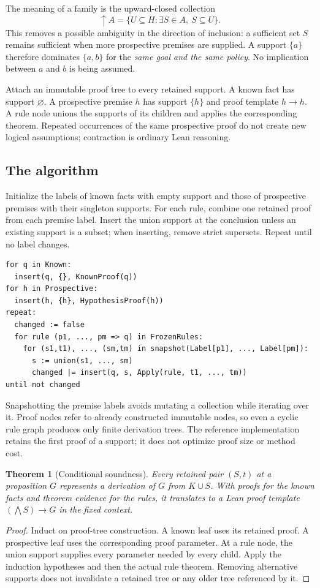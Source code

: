 \documentclass[11pt,a4paper]{article}
\newtheorem{theorem}{Theorem}[section]
\theoremstyle{definition}\newtheorem{definition}[theorem]{Definition}
\theoremstyle{remark}\newtheorem{remark}[theorem]{Remark}
\begin{document}
The meaning of a family is the upward-closed collection
\[
 \uparrow A=\{U\subseteq H:\exists S\in A,\ S\subseteq U\}.
\]
This removes a possible ambiguity in the direction of inclusion: a sufficient set $S$ remains sufficient when more prospective premises are supplied. A support $\{a\}$ therefore dominates $\{a,b\}$ for the \emph{same goal and the same policy}. No implication between $a$ and $b$ is being assumed.

Attach an immutable proof tree to every retained support. A known fact has support $\varnothing$. A prospective premise $h$ has support $\{h\}$ and proof template $h\to h$. A rule node unions the supports of its children and applies the corresponding theorem. Repeated occurrences of the same prospective proof do not create new logical assumptions; contraction is ordinary Lean reasoning.

\subsection{The algorithm}
Initialize the labels of known facts with empty support and those of prospective premises with their singleton supports. For each rule, combine one retained proof from each premise label. Insert the union support at the conclusion unless an existing support is a subset; when inserting, remove strict supersets. Repeat until no label changes.
\begin{lstlisting}
for q in Known:
  insert(q, {}, KnownProof(q))
for h in Prospective:
  insert(h, {h}, HypothesisProof(h))
repeat:
  changed := false
  for rule (p1, ..., pm => q) in FrozenRules:
    for (s1,t1), ..., (sm,tm) in snapshot(Label[p1], ..., Label[pm]):
      s := union(s1, ..., sm)
      changed |= insert(q, s, Apply(rule, t1, ..., tm))
until not changed
\end{lstlisting}
Snapshotting the premise labels avoids mutating a collection while iterating over it. Proof nodes refer to already constructed immutable nodes, so even a cyclic rule graph produces only finite derivation trees. The reference implementation retains the first proof of a support; it does not optimize proof size or method cost.

\begin{theorem}[Conditional soundness]\label{thm:sound}
Every retained pair $(S,t)$ at a proposition $G$ represents a derivation of $G$ from $K\cup S$. With proofs for the known facts and theorem evidence for the rules, it translates to a Lean proof template $(\bigwedge S)\to G$ in the fixed context.
\end{theorem}
\begin{proof}
Induct on proof-tree construction. A known leaf uses its retained proof. A prospective leaf uses the corresponding proof parameter. At a rule node, the union support supplies every parameter needed by every child. Apply the induction hypotheses and then the actual rule theorem. Removing alternative supports does not invalidate a retained tree or any older tree referenced by it.
\end{proof}
\end{document}
